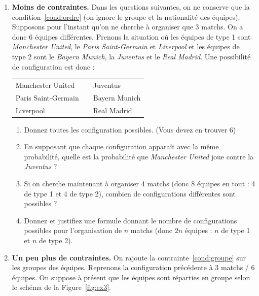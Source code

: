 \documentclass{../ficheTDTP}
\begin{document}
\begin{enumerate}
\item \textbf{Moins de contraintes.} Dans les questions suivantes, on ne conserve que la condition~\eqref{cond:ordre} (on ignore le groupe et la nationalité des équipes). Supposons pour l'instant qu'on ne cherche à organiser que 3 matchs. On a donc 6 équipes différentes. Prenons la situation où les équipes de type 1 sont \textit{Manchester United}, le \textit{Paris Saint-Germain} et \textit{Liverpool} et les équipes de type 2 sont le \textit{Bayern Munich}, la \textit{Juventus} et le \textit{Real Madrid}. Une possibilité de configuration est donc :

\begin{tabular}{lcl}
Manchester United & & Juventus \\
Paris Saint-Germain & & Bayern Munich \\
Liverpool & & Real Madrid
\end{tabular}

\begin{enumerate}
\item Donnez toutes les configuration possibles. (Vous devez en trouver 6)

\item En supposant que chaque configuration apparaît avec la même probabilité, quelle est la probabilité que \textit{Manchester United} joue contre la \textit{Juventus} ?

\item Si on cherche maintenant à organiser 4 matchs (donc 8 équipes en tout : 4 de type 1 et 4 de type 2), combien de configurations différentes sont possibles ?

\item Donnez et justifiez une formule donnant le nombre de configurations possibles pour l'organisation de $n$ matchs (donc $2n$ équipes : $n$ de type 1 et $n$ de type 2).
\end{enumerate}

\item \textbf{Un peu plus de contraintes.} On rajoute la contrainte~\eqref{cond:groupe} sur les groupes des équipes. Reprenons la configuration précédente à 3 matchs / 6 équipes. On suppose à présent que les équipes sont réparties en groupe selon le schéma de la Figure~\ref{fig:ex3}.


\end{enumerate}
\end{document}
